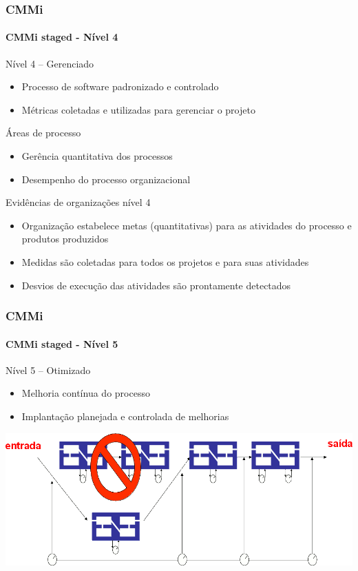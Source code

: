 \begin{frame}
	\frametitle{CMMi}
	\framesubtitle{CMMi staged - Nível 4}
	
	\begin{block:fact}{Nível 4 -- Gerenciado}
		\begin{itemize}
			\item Processo de software padronizado e controlado
			\item Métricas coletadas e utilizadas para gerenciar o projeto
		\end{itemize}
	\end{block:fact}
	
	\begin{block:fact}{Áreas de processo}
		\begin{itemize}
			\item Gerência quantitativa dos processos
			\item Desempenho do processo organizacional
		\end{itemize}
	\end{block:fact}
		

	\begin{block:fact}{Evidências de organizações nível 4}
		\begin{itemize}
			\item Organização estabelece metas (quantitativas) para as atividades do
			processo e produtos produzidos
			\item Medidas são coletadas para todos os projetos e para suas atividades
			\item Desvios de execução das atividades são prontamente detectados
		\end{itemize}
	\end{block:fact}
\end{frame}



\begin{frame}
	\frametitle{CMMi}
	\framesubtitle{CMMi staged - Nível 5}
	
	\begin{block:fact}{Nível 5 -- Otimizado}
		\begin{itemize}
			\item Melhoria contínua do processo
			\item Implantação planejada e controlada de melhorias
		\end{itemize}
	\end{block:fact}
	
	\begin{block:fact}{}
		\centering
		\includegraphics[width=\textwidth]{software-engineering/project-management/process/process-quality/cmmi/cmmi-staged-5}
	\end{block:fact}
\end{frame}



